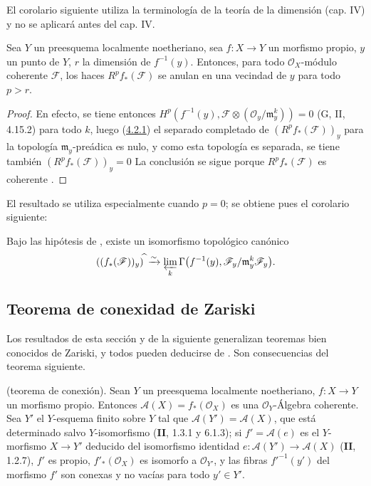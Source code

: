 El corolario siguiente utiliza la terminología de la teoría de la dimensión
(cap. IV) y no se aplicará antes del cap. IV.

\begin{corollary}[4.2.2]
\label{III.4.2.2}
\label{III.4.2.2-fr}
Sea $Y$ un preesquema localmente noetheriano, sea $f:X\to Y$ un morfismo
propio, $y$ un punto de $Y$, $r$ la dimensión de
$f^{-1}(y)$.
Entonces, para todo $\mathcal O_X$-módulo coherente $\mathcal F$, los haces
$R^pf_*(\mathcal F)$ se anulan en una vecindad de $y$ para todo
$p>r$.
\end{corollary}

\begin{proof}
En efecto, se tiene entonces
$H^p(f^{-1}(y),
\mathcal F\otimes(\mathcal O_y/\mathfrak m_y^k))=0$
(G, II, 4.15.2) para todo $k$, luego
(\hyperref[III.4.2.1-fr]{4.2.1}) el separado completado de
$(R^pf_*(\mathcal F))_y$ para la topología
$\mathfrak m_y$-preádica es nulo, y como esta topología es separada, se tiene también $(R^pf_*(\mathcal F))_y=0$
La conclusión se sigue porque $R^pf_*(\mathcal F)$ es coherente
.
\end{proof}

\begin{env}[4.2.3]
\label{III.4.2.3}
\label{III.4.2.3-fr}
El resultado  se utiliza especialmente cuando $p=0$; se obtiene pues el corolario siguiente:
\end{env}

\begin{corollary}[4.2.4]
\label{III.4.2.4}
\label{III.4.2.4-fr}
Bajo las hipótesis de , existe un isomorfismo
topológico canónico
\[
((f_*(\mathcal F))_y)^{\widehat{\,}}
\xrightarrow{\sim}
\varprojlim_k\Gamma\bigl(f^{-1}(y),
\mathcal F_y/\mathfrak m_y^k\mathcal F_y\bigr).
\]
\end{corollary}


\subsection{Teorema de conexidad de Zariski}
\label{subsection:III.4.3}
\label{subsection:III.4.3-fr}
\label{III.4.3}
\label{III.4.3-fr}

Los resultados de esta sección y de la siguiente generalizan teoremas
bien conocidos de Zariski, y todos pueden deducirse de
. Son consecuencias del teorema siguiente.

\begin{theorem}[4.3.1]
\label{III.4.3.1-fr}
\textnormal{(teorema de conexión).}
Sean $Y$ un preesquema localmente noetheriano, $f:X\to Y$ un morfismo
propio. Entonces $\mathcal A(X)=f_*(\mathcal O_X)$ es una
$\mathcal O_Y$-Álgebra coherente.
Sea $Y'$ el $Y$-esquema finito sobre $Y$ tal que
$\mathcal A(Y')=\mathcal A(X)$, que está determinado salvo $Y$-isomorfismo
\textup{(\textbf{II}, 1.3.1 y 6.1.3)}; si $f'=\mathcal A(e)$ es el $Y$-morfismo
$X\to Y'$ deducido del isomorfismo identidad
$e:\mathcal A(Y')\to\mathcal A(X)$ \textup{(\textbf{II}, 1.2.7)}, $f'$ es propio,
$f'_*(\mathcal O_X)$ es isomorfo a $\mathcal O_{Y'}$, y las fibras
$f'^{-1}(y')$ del morfismo $f'$ son conexas y no vacías para todo
$y'\in Y'$.
\end{theorem}

